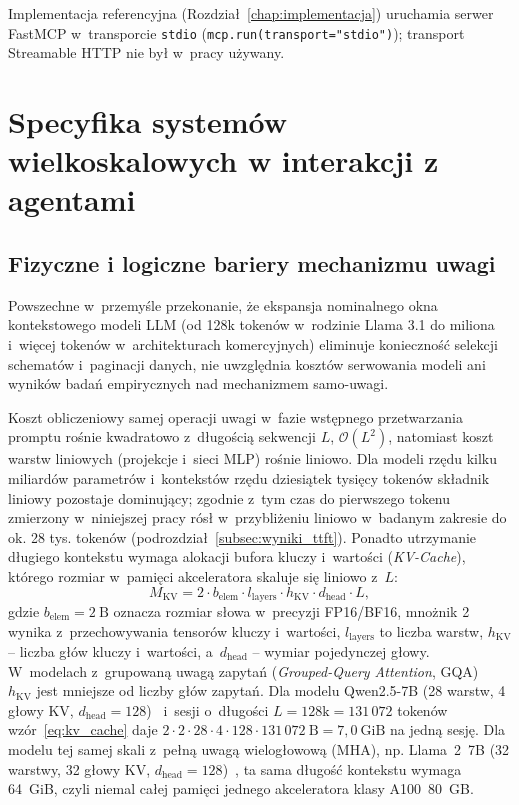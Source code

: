 Implementacja referencyjna (Rozdział~\ref{chap:implementacja}) uruchamia serwer FastMCP w~transporcie \texttt{stdio} (\texttt{mcp.run(transport="stdio")}); transport Streamable HTTP nie był w~pracy używany.


\section{Specyfika systemów wielkoskalowych w interakcji z agentami}
\label{sec:teoria_specyfika_bigdata}

\subsection{Fizyczne i logiczne bariery mechanizmu uwagi}
\label{subsec:teoria_bigdata_3v}

Powszechne w~przemyśle przekonanie, że ekspansja nominalnego okna kontekstowego modeli LLM (od 128k tokenów w~rodzinie Llama 3.1 do miliona i~więcej tokenów w~architekturach komercyjnych) eliminuje konieczność selekcji schematów i~paginacji danych, nie uwzględnia kosztów serwowania modeli ani wyników badań empirycznych nad mechanizmem samo-uwagi.

Koszt obliczeniowy samej operacji uwagi w~fazie wstępnego przetwarzania promptu rośnie kwadratowo z~długością sekwencji $L$, $\mathcal{O}(L^2)$, natomiast koszt warstw liniowych (projekcje i~sieci MLP) rośnie liniowo. Dla modeli rzędu kilku miliardów parametrów i~kontekstów rzędu dziesiątek tysięcy tokenów składnik liniowy pozostaje dominujący; zgodnie z~tym czas do pierwszego tokenu zmierzony w~niniejszej pracy rósł w~przybliżeniu liniowo w~badanym zakresie do ok. 28 tys. tokenów (podrozdział~\ref{subsec:wyniki_ttft}). Ponadto utrzymanie długiego kontekstu wymaga alokacji bufora kluczy i~wartości (\emph{KV-Cache}), którego rozmiar w~pamięci akceleratora skaluje się liniowo z~$L$:
\begin{equation}
    M_{\text{KV}} = 2 \cdot b_{\text{elem}} \cdot l_{\text{layers}} \cdot h_{\text{KV}} \cdot d_{\text{head}} \cdot L,
    \label{eq:kv_cache}
\end{equation}
gdzie $b_{\text{elem}} = 2\ \text{B}$ oznacza rozmiar słowa w~precyzji FP16/BF16, mnożnik 2 wynika z~przechowywania tensorów kluczy i~wartości, $l_{\text{layers}}$ to liczba warstw, $h_{\text{KV}}$ -- liczba głów kluczy i~wartości, a~$d_{\text{head}}$ -- wymiar pojedynczej głowy. W~modelach z~grupowaną uwagą zapytań (\emph{Grouped-Query Attention}, GQA)~\cite{ainslie2023gqa} $h_{\text{KV}}$ jest mniejsze od liczby głów zapytań. Dla modelu Qwen2.5-7B (28 warstw, 4 głowy KV, $d_{\text{head}} = 128$)~\cite{qwen2025qwen25} i~sesji o~długości $L = 128\text{k} = 131\,072$ tokenów wzór~\eqref{eq:kv_cache} daje $2 \cdot 2 \cdot 28 \cdot 4 \cdot 128 \cdot 131\,072\ \text{B} = 7{,}0\ \text{GiB}$ na jedną sesję. Dla modelu tej samej skali z~pełną uwagą wielogłowową (MHA), np. Llama~2~7B (32 warstwy, 32 głowy KV, $d_{\text{head}} = 128$)~\cite{touvron2023llama2}, ta sama długość kontekstu wymaga 64~GiB, czyli niemal całej pamięci jednego akceleratora klasy A100~80~GB.

